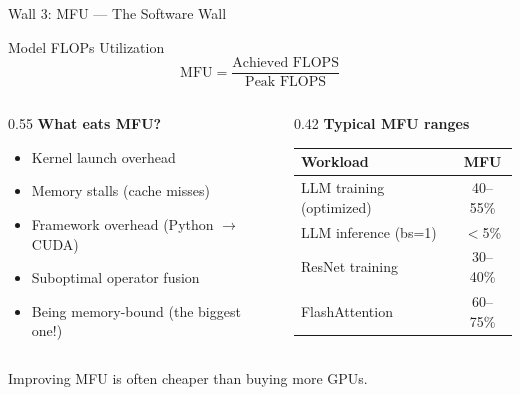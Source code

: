 \documentclass[aspectratio=169, 12pt]{beamer}
\newcommand{\wallbox}[2]{%
  \begin{block}{#1}#2\end{block}%
}
\begin{document}
\begin{frame}{Wall 3: MFU --- The Software Wall}

\small
\wallbox{Model FLOPs Utilization}{
\[
  \text{MFU} = \frac{\text{Achieved FLOPS}}{\text{Peak FLOPS}}
\]
}

\vspace{0.2cm}
\begin{columns}[T]
\begin{column}{0.55\textwidth}
\textbf{What eats MFU?}
\begin{itemize}\setlength\itemsep{2pt}
  \item Kernel launch overhead
  \item Memory stalls (cache misses)
  \item Framework overhead (Python $\to$ CUDA)
  \item Suboptimal operator fusion
  \item \alert{Being memory-bound} (the biggest one!)
\end{itemize}
\end{column}
\begin{column}{0.42\textwidth}
\centering
\textbf{Typical MFU ranges}\\[4pt]
\scriptsize
\begin{tabular}{lc}
\toprule
Workload & MFU \\
\midrule
LLM training (optimized) & 40--55\% \\
LLM inference (bs=1) & $<$5\% \\
ResNet training & 30--40\% \\
FlashAttention & 60--75\% \\
\bottomrule
\end{tabular}
\end{column}
\end{columns}

\vspace{0.2cm}
\alert{Improving MFU is often cheaper than buying more GPUs.}
\end{frame}
\end{document}
